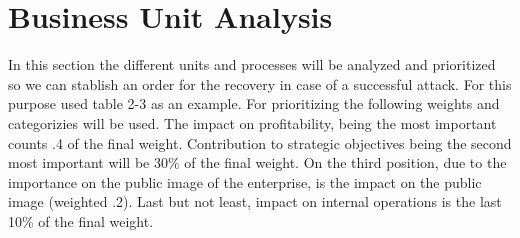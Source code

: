 \section{Business Unit Analysis}\label{sec:BusinessUnitAnalysis}
In this section the different units and processes will be analyzed and prioritized so we can stablish an order for the recovery in case of a successful attack. For this purpose used table 2-3 \cite{whitman3} as an example. For prioritizing the following weights and categorizies will be used. The impact on profitability, being the most important counts .4 of the final weight. Contribution to strategic objectives being the second most important will be 30\% of the final weight. On the third position, due to the importance on the public image of the enterprise, is the impact on the public image (weighted .2). Last but not least, impact on internal operations is the last 10\% of the final weight.

